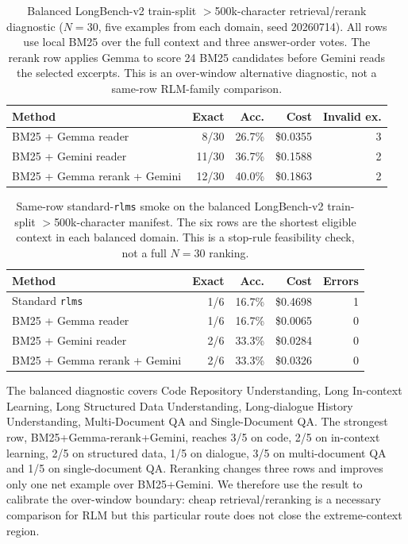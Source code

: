 \documentclass[letterpaper]{article}
\begin{document}
\begin{table}[!t]
\centering
\small
\setlength{\tabcolsep}{4pt}
\begin{tabular}{@{}p{6.0cm}rrrr@{}}
\toprule
\textbf{Method} & \textbf{Exact} & \textbf{Acc.} & \textbf{Cost} & \textbf{Invalid ex.} \\
\midrule
BM25 + Gemma reader & 8/30 & 26.7\% & \$0.0355 & 3 \\
BM25 + Gemini reader & 11/30 & 36.7\% & \$0.1588 & 2 \\
BM25 + Gemma rerank + Gemini & 12/30 & 40.0\% & \$0.1863 & 2 \\
\bottomrule
\end{tabular}
\caption{Balanced LongBench-v2 train-split $>$500k-character retrieval/rerank diagnostic ($N=30$, five examples from each domain, seed 20260714). All rows use local BM25 over the full context and three answer-order votes. The rerank row applies Gemma to score 24 BM25 candidates before Gemini reads the selected excerpts. This is an over-window alternative diagnostic, not a same-row RLM-family comparison.}
\label{tab:supp-lb2-over500k-rerank}
\end{table}

\begin{table}[!t]
\centering
\small
\setlength{\tabcolsep}{4pt}
\begin{tabular}{@{}p{6.0cm}rrrr@{}}
\toprule
\textbf{Method} & \textbf{Exact} & \textbf{Acc.} & \textbf{Cost} & \textbf{Errors} \\
\midrule
Standard \texttt{rlms} & 1/6 & 16.7\% & \$0.4698 & 1 \\
BM25 + Gemma reader & 1/6 & 16.7\% & \$0.0065 & 0 \\
BM25 + Gemini reader & 2/6 & 33.3\% & \$0.0284 & 0 \\
BM25 + Gemma rerank + Gemini & 2/6 & 33.3\% & \$0.0326 & 0 \\
\bottomrule
\end{tabular}
\caption{Same-row standard-\texttt{rlms} smoke on the balanced LongBench-v2 train-split $>$500k-character manifest. The six rows are the shortest eligible context in each balanced domain. This is a stop-rule feasibility check, not a full $N=30$ ranking.}
\label{tab:supp-lb2-over500k-rlm-smoke}
\end{table}

The balanced diagnostic covers Code Repository Understanding, Long In-context Learning, Long Structured Data Understanding, Long-dialogue History Understanding, Multi-Document QA and Single-Document QA. The strongest row, BM25+Gemma-rerank+Gemini, reaches 3/5 on code, 2/5 on in-context learning, 2/5 on structured data, 1/5 on dialogue, 3/5 on multi-document QA and 1/5 on single-document QA. Reranking changes three rows and improves only one net example over BM25+Gemini. We therefore use the result to calibrate the over-window boundary: cheap retrieval/reranking is a necessary comparison for RLM but this particular route does not close the extreme-context region.
\end{document}
